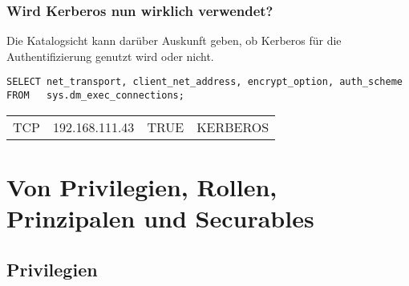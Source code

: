         \subsubsection{Wird Kerberos nun wirklich verwendet?}
          Die Katalogsicht  kann darüber
          Auskunft geben, ob Kerberos für die Authentifizierung genutzt wird
          oder nicht.
          \begin{lstlisting}[language=ms_sql,caption={Wie wird
        authentifiziert?},label=sql19_01]
SELECT net_transport, client_net_address, encrypt_option, auth_scheme
FROM   sys.dm_exec_connections;
          \end{lstlisting}
          \begin{center}
            \begin{small}
              \tablehead{}
              \begin{mssql}
                \begin{supertabular}{llll}
                  TCP & 192.168.111.43 & TRUE & KERBEROS \\
                \end{supertabular}
              \end{mssql}
            \end{small}
          \end{center}
    \section{Von Privilegien, Rollen, Prinzipalen und Securables}
      \subsection{Privilegien}
